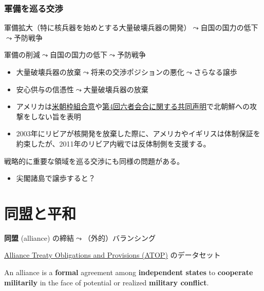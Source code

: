 \documentclass[
  xelatex,
  ja=standard]{bxjsarticle}
\providecommand{\tightlist}{%
  \setlength{\itemsep}{0pt}\setlength{\parskip}{0pt}}\usepackage{longtable,booktabs,array}
\begin{document}
\hypertarget{ux8ecdux5099ux3092ux5de1ux308bux4ea4ux6e09}{%
\subsubsection{軍備を巡る交渉}\label{ux8ecdux5099ux3092ux5de1ux308bux4ea4ux6e09}}

軍備拡大（特に核兵器を始めとする大量破壊兵器の開発）\(\leadsto\)自国の国力の低下\(\leadsto\)予防戦争

軍備の削減\(\leadsto\)自国の国力の低下\(\leadsto\)予防戦争

\begin{itemize}
\tightlist
\item
  大量破壊兵器の放棄\(\leadsto\)将来の交渉ポジションの悪化\(\leadsto\)さらなる譲歩
\item
  安心供与の信憑性\(\leadsto\)大量破壊兵器の放棄
\item
  アメリカは\href{https://peacemaker.un.org/node/1129}{米朝枠組合意}や\href{https://www.mofa.go.jp/mofaj/area/n_korea/6kaigo/ks_050919.html}{第4回六者会合に関する共同声明}で北朝鮮への攻撃をしない旨を表明
\item
  2003年にリビアが核開発を放棄した際に、アメリカやイギリスは体制保証を約束したが、2011年のリビア内戦では反体制側を支援する。
\end{itemize}

戦略的に重要な領域を巡る交渉にも同様の問題がある。

\begin{itemize}
\tightlist
\item
  尖閣諸島で譲歩すると？
\end{itemize}

\hypertarget{ux540cux76dfux3068ux5e73ux548c}{%
\section{同盟と平和}\label{ux540cux76dfux3068ux5e73ux548c}}

\textbf{同盟} (alliance) の締結\(\leadsto\)（外的）バランシング

\href{http://www.atopdata.org/}{Alliance Treaty Obligations and
Provisions (ATOP)} のデータセット\citep{leeds2002}

\begin{tcolorbox}[enhanced jigsaw, colbacktitle=quarto-callout-note-color!10!white, breakable, toptitle=1mm, opacitybacktitle=0.6, leftrule=.75mm, bottomrule=.15mm, title=\textcolor{quarto-callout-note-color}{\faInfo}\hspace{0.5em}{\href{http://www.atopdata.org/uploads/6/9/1/3/69134503/atop_5_1_codebook.pdf}{ATOPにおける同盟の定義}}, titlerule=0mm, bottomtitle=1mm, rightrule=.15mm, arc=.35mm, toprule=.15mm, left=2mm, opacityback=0, coltitle=black, colback=white, colframe=quarto-callout-note-color-frame]

An alliance is a \textbf{formal} agreement among \textbf{independent
states} to \textbf{cooperate militarily} in the face of potential or
realized \textbf{military conflict}.

\end{tcolorbox}
\end{document}
